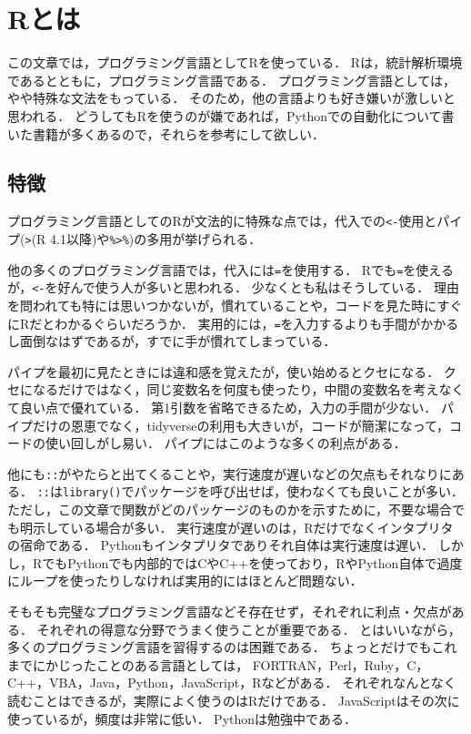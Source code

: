 \documentclass[
]{article}
\begin{document}
\hypertarget{R}{%
\section{Rとは}\label{R}}

この文章では，プログラミング言語としてRを使っている．
Rは，統計解析環境であるとともに，プログラミング言語である．
プログラミング言語としては，やや特殊な文法をもっている．
そのため，他の言語よりも好き嫌いが激しいと思われる．
どうしてもRを使うのが嫌であれば，Pythonでの自動化について書いた書籍が多くあるので，それらを参考にして欲しい．

\hypertarget{ux7279ux5fb4-1}{%
\subsection{特徴}\label{ux7279ux5fb4-1}}

プログラミング言語としてのRが文法的に特殊な点では，代入での\texttt{\textless{}-}使用とパイプ(\texttt{\textbar{}\textgreater{}}(R 4.1以降)や\texttt{\%\textgreater{}\%})の多用が挙げられる．

他の多くのプログラミング言語では，代入には\texttt{=}を使用する．
Rでも\texttt{=}を使えるが，\texttt{\textless{}-}を好んで使う人が多いと思われる．
少なくとも私はそうしている．
理由を問われても特には思いつかないが，慣れていることや，コードを見た時にすぐにRだとわかるぐらいだろうか．
実用的には，\texttt{=}を入力するよりも手間がかかるし面倒なはずであるが，すでに手が慣れてしまっている．

パイプを最初に見たときには違和感を覚えたが，使い始めるとクセになる．
クセになるだけではなく，同じ変数名を何度も使ったり，中間の変数名を考えなくて良い点で優れている．
第1引数を省略できるため，入力の手間が少ない．
パイプだけの恩恵でなく，tidyverseの利用も大きいが，コードが簡潔になって，コードの使い回しがし易い．
パイプにはこのような多くの利点がある．

他にも\texttt{::}がやたらと出てくることや，実行速度が遅いなどの欠点もそれなりにある．
\texttt{::}は\texttt{library()}でパッケージを呼び出せば，使わなくても良いことが多い．
ただし，この文章で関数がどのパッケージのものかを示すために，不要な場合でも明示している場合が多い．
実行速度が遅いのは，Rだけでなくインタプリタの宿命である．
Pythonもインタプリタでありそれ自体は実行速度は遅い．
しかし，RでもPythonでも内部的ではCやC++を使っており，RやPython自体で過度にループを使ったりしなければ実用的にはほとんど問題ない．

そもそも完璧なプログラミング言語などそ存在せず，それぞれに利点・欠点がある．
それぞれの得意な分野でうまく使うことが重要である．
とはいいながら，多くのプログラミング言語を習得するのは困難である．
ちょっとだけでもこれまでにかじったことのある言語としては，
FORTRAN，Perl，Ruby，C，C++，VBA，Java，Python，JavaScript，Rなどがある．
それぞれなんとなく読むことはできるが，実際によく使うのはRだけである．
JavaScriptはその次に使っているが，頻度は非常に低い．
Pythonは勉強中である．
\end{document}
